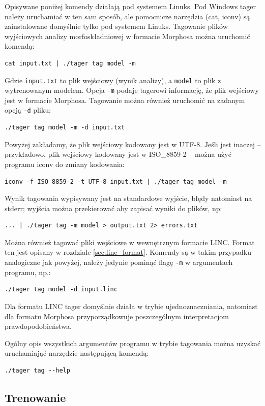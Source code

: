 \documentclass[a4paper,10]{article}
\begin{document}
Opisywane poniżej komendy działają pod systemem Linuks. Pod
Windows tager należy uruchamiać w ten sam sposób, ale
pomocnicze narzędzia (cat, iconv) są zainstalowane
domyślnie tylko pod systemem Linuks.
Tagowanie plików wyjściowych analizy morfoskładniowej w formacie
Morphosa można uruchomić komendą:
\begin{verbatim}
cat input.txt | ./tager tag model -m
\end{verbatim}
Gdzie \verb|input.txt| to plik wejściowy (wynik analizy),
a \verb|model| to plik z wytrenowanym modelem.
Opcja \verb|-m| podaje tagerowi informację, że plik wejściowy
jest w formacie Morphosa. Tagowanie można również uruchomić
na zadanym opcją \verb|-d| pliku:
\begin{verbatim}
./tager tag model -m -d input.txt
\end{verbatim}
Powyżej zakładamy, że plik wejściowy kodowany jest w UTF-8.
Jeśli jest inaczej -- przykładowo, plik wejściowy kodowany jest
w ISO\_8859-2 -- można użyć programu iconv do zmiany kodowania:
\begin{verbatim}
iconv -f ISO_8859-2 -t UTF-8 input.txt | ./tager tag model -m
\end{verbatim}
Wynik tagowania wypisywany jest na standardowe wyjście, błędy
natomiast na stderr; wyjścia można przekierować aby zapisać
wyniki do plików, np:
\begin{verbatim}
... | ./tager tag -m model > output.txt 2> errors.txt
\end{verbatim}

Można również tagować pliki wejściowe w wewnętrznym formacie LINC.
Format ten jest opisany w rozdziale \ref{sec:linc_format}.
Komendy są w takim przypadku analogiczne jak powyżej, należy
jedynie pominąć flagę \verb|-m| w argumentach programu, np.:
\begin{verbatim}
./tager tag model -d input.linc
\end{verbatim}
Dla formatu LINC tager domyślnie działa w trybie ujednoznaczniania,
natomiast dla formatu Morphosa przyporządkowuje poszczególnym
interpretacjom prawdopodobieństwa.

Ogólny opis wszystkich argumentów programu w trybie tagowania
można uzyskać uruchamiająć narzędzie następującą komendą:
\begin{verbatim}
./tager tag --help
\end{verbatim}

\subsection{Trenowanie}
\end{document}
